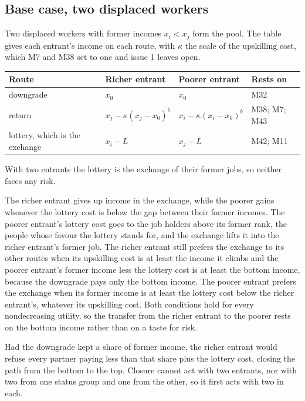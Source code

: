 \documentclass[10pt]{article}
\begin{document}
\subsection*{Base case, two displaced workers}
Two displaced workers with former incomes $x_i<x_j$ form the pool. The table gives each entrant’s income on each route, with $\kappa$ the scale of the upskilling cost, which M7 and M38 set to one and issue 1 leaves open.

\begin{longtable}{>{\raggedright\arraybackslash}p{5.0cm} >{\raggedright\arraybackslash}p{5.0cm} >{\raggedright\arraybackslash}p{5.0cm} >{\raggedright\arraybackslash}p{8.0cm}}
\toprule Route & Richer entrant & Poorer entrant & Rests on \\ \midrule \endhead
downgrade & $x_0$ & $x_0$ & M32 \\ \midrule
return & $x_j-\kappa(x_j-x_0)^b$ & $x_i-\kappa(x_i-x_0)^b$ & M38; M7; M43 \\ \midrule
lottery, which is the exchange & $x_i-L$ & $x_j-L$ & M42; M11 \\ \midrule
\end{longtable}

With two entrants the lottery is the exchange of their former jobs, so neither faces any risk.

The richer entrant gives up income in the exchange, while the poorer gains whenever the lottery cost is below the gap between their former incomes. The poorer entrant's lottery cost goes to the job holders above its former rank, the people whose favour the lottery stands for, and the exchange lifts it into the richer entrant's former job. The richer entrant still prefers the exchange to its other routes when its upskilling cost is at least the income it climbs and the poorer entrant's former income less the lottery cost is at least the bottom income, because the downgrade pays only the bottom income. The poorer entrant prefers the exchange when its former income is at least the lottery cost below the richer entrant's, whatever its upskilling cost. Both conditions hold for every nondecreasing utility, so the transfer from the richer entrant to the poorer rests on the bottom income rather than on a taste for risk.

Had the downgrade kept a share of former income, the richer entrant would refuse every partner paying less than that share plus the lottery cost, closing the path from the bottom to the top. Closure cannot act with two entrants, nor with two from one status group and one from the other, so it first acts with two in each.
\end{document}

